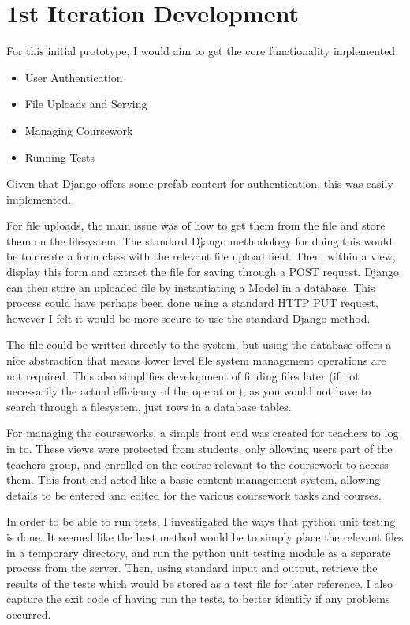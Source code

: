 \documentclass[a4paper,11pt]{report}
\begin{document}
\section{1st Iteration Development}
\label{sec:iter1dev}
For this initial prototype, I would aim to get the core functionality implemented:
\begin{itemize}
\item User Authentication
\item File Uploads and Serving
\item Managing Coursework
\item Running Tests
\end{itemize}
Given that Django offers some prefab content for authentication, this was easily implemented.\par
For file uploads, the main issue was of how to get them from the file and store them on the filesystem. The standard Django methodology for doing this would be to create a form class with the relevant file upload field. Then, within a view, display this form and extract the file for saving through a POST request. Django can then store an uploaded file by instantiating a Model in a database. This process could have perhaps been done using a standard HTTP PUT request, however I felt it would be more secure to use the standard Django method.\par
The file could be written directly to the system, but using the database offers a nice abstraction that means lower level file system management operations are not required. This also simplifies development of finding files later (if not necessarily the actual efficiency of the operation), as you would not have to search through a filesystem, just rows in a database tables.\par
For managing the courseworks, a simple front end was created for teachers to log in to. These views were protected from students, only allowing users part of the teachers group, and enrolled on the course relevant to the coursework to access them. This front end acted like a basic content management system, allowing details to be entered and edited for the various coursework tasks and courses.\par
In order to be able to run tests, I investigated the ways that python unit testing is done. It seemed like the best method would be to simply place the relevant files in a temporary directory, and run the python unit testing module as a separate process from the server. Then, using standard input and output, retrieve the results of the tests which would be stored as a text file for later reference. I also capture the exit code of having run the tests, to better identify if any problems occurred.\par
\end{document}
